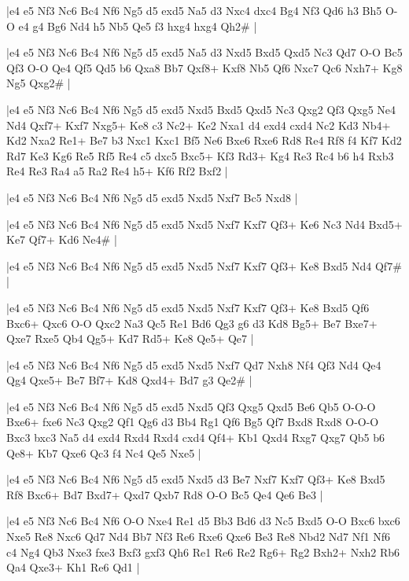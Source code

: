 \whitename{}
\blackname{}
\makegametitle
|e4 e5 Nf3 Nc6 Bc4 Nf6 Ng5 d5 exd5 Na5 d3 Nxc4 dxc4 Bg4 Nf3 Qd6 h3 Bh5 O-O e4 g4 Bg6 Nd4 h5 Nb5 Qe5 f3 hxg4 hxg4 Qh2\#  |

\whitename{}
\blackname{}
\makegametitle
|e4 e5 Nf3 Nc6 Bc4 Nf6 Ng5 d5 exd5 Na5 d3 Nxd5 Bxd5 Qxd5 Nc3 Qd7 O-O Bc5 Qf3 O-O Qe4 Qf5 Qd5 b6 Qxa8 Bb7 Qxf8+ Kxf8 Nb5 Qf6 Nxc7 Qc6 Nxh7+ Kg8 Ng5 Qxg2\#  |

\whitename{}
\blackname{}
\makegametitle
|e4 e5 Nf3 Nc6 Bc4 Nf6 Ng5 d5 exd5 Nxd5 Bxd5 Qxd5 Nc3 Qxg2 Qf3 Qxg5 Ne4 Nd4 Qxf7+ Kxf7 Nxg5+ Ke8 c3 Nc2+ Ke2 Nxa1 d4 exd4 cxd4 Nc2 Kd3 Nb4+ Kd2 Nxa2 Re1+ Be7 b3 Nxc1 Kxc1 Bf5 Ne6 Bxe6 Rxe6 Rd8 Re4 Rf8 f4 Kf7 Kd2 Rd7 Ke3 Kg6 Re5 Rf5 Re4 c5 dxc5 Bxc5+ Kf3 Rd3+ Kg4 Re3 Rc4 b6 h4 Rxb3 Re4 Re3 Ra4 a5 Ra2 Re4 h5+ Kf6 Rf2 Bxf2  |

\whitename{}
\blackname{}
\makegametitle
|e4 e5 Nf3 Nc6 Bc4 Nf6 Ng5 d5 exd5 Nxd5 Nxf7 Bc5 Nxd8  |

\whitename{}
\blackname{}
\makegametitle
|e4 e5 Nf3 Nc6 Bc4 Nf6 Ng5 d5 exd5 Nxd5 Nxf7 Kxf7 Qf3+ Ke6 Nc3 Nd4 Bxd5+ Ke7 Qf7+ Kd6 Ne4\#  |

\whitename{}
\blackname{}
\makegametitle
|e4 e5 Nf3 Nc6 Bc4 Nf6 Ng5 d5 exd5 Nxd5 Nxf7 Kxf7 Qf3+ Ke8 Bxd5 Nd4 Qf7\#  |

\whitename{}
\blackname{}
\makegametitle
|e4 e5 Nf3 Nc6 Bc4 Nf6 Ng5 d5 exd5 Nxd5 Nxf7 Kxf7 Qf3+ Ke8 Bxd5 Qf6 Bxc6+ Qxc6 O-O Qxc2 Na3 Qc5 Re1 Bd6 Qg3 g6 d3 Kd8 Bg5+ Be7 Bxe7+ Qxe7 Rxe5 Qb4 Qg5+ Kd7 Rd5+ Ke8 Qe5+ Qe7  |

\whitename{}
\blackname{}
\makegametitle
|e4 e5 Nf3 Nc6 Bc4 Nf6 Ng5 d5 exd5 Nxd5 Nxf7 Qd7 Nxh8 Nf4 Qf3 Nd4 Qe4 Qg4 Qxe5+ Be7 Bf7+ Kd8 Qxd4+ Bd7 g3 Qe2\#  |

\whitename{}
\blackname{}
\makegametitle
|e4 e5 Nf3 Nc6 Bc4 Nf6 Ng5 d5 exd5 Nxd5 Qf3 Qxg5 Qxd5 Be6 Qb5 O-O-O Bxe6+ fxe6 Nc3 Qxg2 Qf1 Qg6 d3 Bb4 Rg1 Qf6 Bg5 Qf7 Bxd8 Rxd8 O-O-O Bxc3 bxc3 Na5 d4 exd4 Rxd4 Rxd4 cxd4 Qf4+ Kb1 Qxd4 Rxg7 Qxg7 Qb5 b6 Qe8+ Kb7 Qxe6 Qc3 f4 Nc4 Qe5 Nxe5  |

\whitename{}
\blackname{}
\makegametitle
|e4 e5 Nf3 Nc6 Bc4 Nf6 Ng5 d5 exd5 Nxd5 d3 Be7 Nxf7 Kxf7 Qf3+ Ke8 Bxd5 Rf8 Bxc6+ Bd7 Bxd7+ Qxd7 Qxb7 Rd8 O-O Bc5 Qe4 Qe6 Be3  |

\whitename{}
\blackname{}
\makegametitle
|e4 e5 Nf3 Nc6 Bc4 Nf6 O-O Nxe4 Re1 d5 Bb3 Bd6 d3 Nc5 Bxd5 O-O Bxc6 bxc6 Nxe5 Re8 Nxc6 Qd7 Nd4 Bb7 Nf3 Re6 Rxe6 Qxe6 Be3 Re8 Nbd2 Nd7 Nf1 Nf6 c4 Ng4 Qb3 Nxe3 fxe3 Bxf3 gxf3 Qh6 Re1 Re6 Re2 Rg6+ Rg2 Bxh2+ Nxh2 Rb6 Qa4 Qxe3+ Kh1 Re6 Qd1  |

